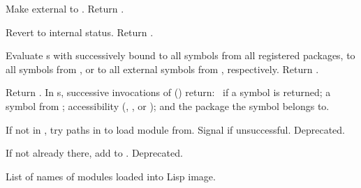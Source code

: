 \begin{LIST}{1cm}
  {
  Make  external to . Return \retval{\T}.
  }

  {
  Revert  to internal status. Return \retval{\T}.
  }
  
  {
  Evaluate s with  successively bound to all
  symbols from all registered packages, to all symbols from
  , or to all external symbols from ,
  respectively. Return . 
  }

  {
  Return . In s, successive
  invocations of  () return: \T\ if a symbol is returned;
  a symbol from ; accessibility
  (, , or ); and the
  package the symbol belongs to.
  }

  {
  If not in , try paths in  to load
  module from. Signal  if unsuccessful. Deprecated.
  }

  {
  If not already there, add  to
  . Deprecated. 
  }

  {
  List of names of modules loaded into Lisp image.
  }

\end{LIST}


